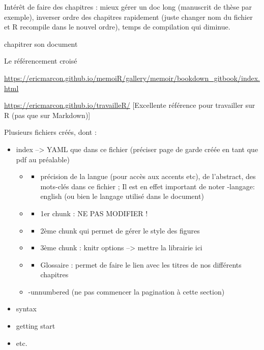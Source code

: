 \documentclass[
  12pt,
  american,
  a4paper,
  extrafontsizes,onecolumn,openright
  ]{memoir}
\providecommand{\tightlist}{%
  \setlength{\itemsep}{0pt}\setlength{\parskip}{0pt}}
\begin{document}
Intérêt de faire des chapitres : mieux gérer un doc long (manuscrit de thèse par exemple), inverser ordre des chapitres rapidement (juste changer nom du fichier et R recompile dans le nouvel ordre), temps de compilation qui diminue.

chapitrer son document

Le référencement croisé

\url{https://ericmarcon.github.io/memoiR/gallery/memoir/bookdown_gitbook/index.html}

\url{https://ericmarcon.github.io/travailleR/} {[}Excellente référence pour travailler sur R (pas que sur Markdown){]}

Plusieurs fichiers créés, dont :

\begin{itemize}
\item
  index --\textgreater{} YAML que dans ce fichier (préciser page de garde créée en tant que pdf au préalable)

  \begin{itemize}
  \item
    \begin{itemize}
    \tightlist
    \item
      précision de la langue (pour accès aux accents etc), de l'abstract, des mots-clés dans ce fichier ; Il est en effet important de noter -langage: english (ou bien le langage utilisé dans le document)
    \end{itemize}
  \item
    \begin{itemize}
    \tightlist
    \item
      1er chunk : NE PAS MODIFIER !
    \end{itemize}
  \item
    \begin{itemize}
    \tightlist
    \item
      2ème chunk qui permet de gérer le style des figures
    \end{itemize}
  \item
    \begin{itemize}
    \tightlist
    \item
      3ème chunk : knitr options --\textgreater{} mettre la librairie ici
    \end{itemize}
  \item
    \begin{itemize}
    \tightlist
    \item
      Glossaire : permet de faire le lien avec les titres de nos différents chapitres
    \end{itemize}
  \item
    -unnumbered (ne pas commencer la pagination à cette section)
  \end{itemize}
\item
  syntax
\item
  getting start
\item
  etc.
\end{itemize}
\end{document}
